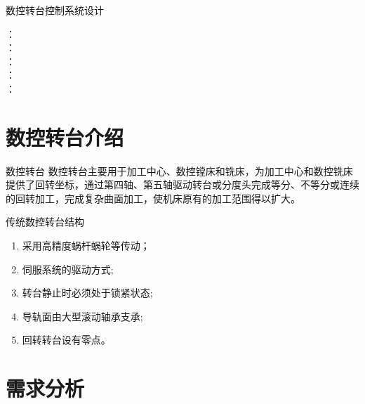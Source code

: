 \documentclass[12pt,xcolor={rgb}]{beamer}
\begin{document}
\title{}
\author{2017年2月20日}
\date{}

\begin{frame}[plain]

\begin{center}
{\LARGE  数控转台控制系统设计 }

\vspace{1.1cm}
 ：~
\underline{ }\\
：~
\underline{ }\\
：~
\underline{ }\\
：~
\underline{ }\\ ：~
\underline{ }\\	

\end{center}

\end{frame}

\section{数控转台介绍}

\begin{frame}{数控转台}
数控转台主要用于加工中心、数控镗床和铣床，为加工中心和数控铣床提供了回转坐标，通过第四轴、第五轴驱动转台或分度头完成等分、不等分或连续的回转加工，完成复杂曲面加工，使机床原有的加工范围得以扩大。
\end{frame}

\begin{frame}{传统数控转台结构}
\begin{enumerate}
	\item 采用高精度蜗杆蜗轮等传动；
	\item 伺服系统的驱动方式;
	\item 转台静止时必须处于锁紧状态;
	\item 导轨面由大型滚动轴承支承;
	\item 回转转台设有零点。
\end{enumerate}

\end{frame}

\section{需求分析}
\end{document}
